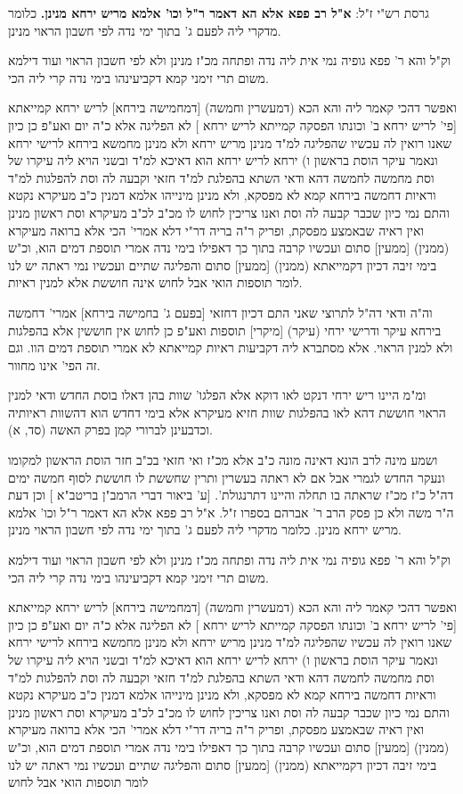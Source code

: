 \documentclass[12pt, openany]{book}
\begin{document}
{ גרסת רש"י ז"ל: \textbf{א"ל רב פפא אלא הא דאמר ר"ל וכו' אלמא מריש ירחא מנינן.}  כלומר מדקרי ליה לפעם ג' בתוך ימי נדה לפי חשבון הראוי מנינן.\par  וק"ל והא ר' פפא גופיה נמי אית ליה נדה ופתחה מכ"ז מנינן ולא לפי חשבון הראוי ועוד דילמא משום תרי זימני קמא דקביעינהו בימי נדה קרי ליה הכי.\par  ואפשר דהכי קאמר ליה והא הכא (דמעשרין וחמשה) [דמחמישה בירחא] לריש ירחא קמייאתא [{\small פי' לריש ירחא ב' וכונתו הפסקה קמייתא לריש ירחא} ] לא הפליגה אלא כ"ה יום ואע"פ כן כיון שאנו רואין לה עכשיו שהפליגה למ"ד מנינן מריש ירחא ולא מנינן מחמשא בירחא לרישי ירחא ונאמר עיקר הוסת בראשון ו) ירחא לריש ירחא הוא דאיכא למ"ד ובשני הויא ליה עיקרו של וסת מחמשה לחמשה דהא ודאי השתא בהפלגת למ"ד חזאי וקבעה לה וסת להפלגות למ"ד וראיות דחמשה בירחא קמא לא מפסקא, ולא מנינן מינייהו אלמא דמנין כ"ב מעיקרא נקטא והתם נמי כיון שכבר קבעה לה וסת ואנו צריכין לחוש לו מכ"ב לכ"ב מעיקרא וסת ראשון מנינן ואין ראיה שבאמצע מפסקת, ופריק ר"ה בריה דר"י דלא אמרי' הכי אלא ברואה מעיקרא (ממנין) [ממעין] סתום ועכשיו קרבה בתוך כך דאפילו בימי נדה אמרי תוספת דמים הוא, וכ"ש בימי זיבה דכיון דקמייאתא (ממנין) [ממעין] סתום והפליגה שתיים ועכשיו נמי ראתה יש לנו לומר תוספות הואי אבל לחוש אינה חוששת אלא למנין ראיות.\par  וה"ה ודאי דה"ל לתרוצי שאני התם דכיון דחזאי [בפעם ג' בחמישה בירחא] אמרי' דחמשה בירחא עיקר ודרישי ירחי (עיקר) [מיקרי] תוספות ואע"פ כן לחוש אין חוששין אלא בהפלגות ולא למנין הראוי. אלא מסתברא ליה דקביעות ראיות קמייאתא לא אמרי תוספת דמים הוו. וגם זה הפי' אינו מחוור.\par  ומ"מ היינו ריש ירחי דנקט לאו דוקא אלא הפלגו' שוות בהן דאלו בוסת החדש ודאי למנין הראוי חוששת דהא לאו בהפלגות שוות חזיא מעיקרא אלא בימי דחדש הוא דהשוות ראיותיה וכדבעינן לברורי קמן בפרק האשה (סד, א).\par ושמע מינה לרב הונא דאינה מונה כ"ב אלא מכ"ז ואי חזאי בכ"ב חזר הוסת הראשון למקומו ונעקר החדש לגמרי אבל אם לא ראתה בעשרין ותרין שחששת לו חוששת לסוף חמשה ימים דה"ל כ"ז מכ"ז שראתה בו תחלה והיינו דתרנגולת'. [{\small ע' ביאור דברי הרמב"ן בריטב"א} ] וכן דעת ה"ר משה ולא כן פסק הרב ר' אברהם בספרו ז"ל.  א"ל רב פפא אלא הא דאמר ר"ל וכו' אלמא מריש ירחא מנינן. כלומר מדקרי ליה לפעם ג' בתוך ימי נדה לפי חשבון הראוי מנינן.\par  וק"ל והא ר' פפא גופיה נמי אית ליה נדה ופתחה מכ"ז מנינן ולא לפי חשבון הראוי ועוד דילמא משום תרי זימני קמא דקביעינהו בימי נדה קרי ליה הכי.\par  ואפשר דהכי קאמר ליה והא הכא (דמעשרין וחמשה) [דמחמישה בירחא] לריש ירחא קמייאתא [{\small פי' לריש ירחא ב' וכונתו הפסקה קמייתא לריש ירחא} ] לא הפליגה אלא כ"ה יום ואע"פ כן כיון שאנו רואין לה עכשיו שהפליגה למ"ד מנינן מריש ירחא ולא מנינן מחמשא בירחא לרישי ירחא ונאמר עיקר הוסת בראשון ו) ירחא לריש ירחא הוא דאיכא למ"ד ובשני הויא ליה עיקרו של וסת מחמשה לחמשה דהא ודאי השתא בהפלגת למ"ד חזאי וקבעה לה וסת להפלגות למ"ד וראיות דחמשה בירחא קמא לא מפסקא, ולא מנינן מינייהו אלמא דמנין כ"ב מעיקרא נקטא והתם נמי כיון שכבר קבעה לה וסת ואנו צריכין לחוש לו מכ"ב לכ"ב מעיקרא וסת ראשון מנינן ואין ראיה שבאמצע מפסקת, ופריק ר"ה בריה דר"י דלא אמרי' הכי אלא ברואה מעיקרא (ממנין) [ממעין] סתום ועכשיו קרבה בתוך כך דאפילו בימי נדה אמרי תוספת דמים הוא, וכ"ש בימי זיבה דכיון דקמייאתא (ממנין) [ממעין] סתום והפליגה שתיים ועכשיו נמי ראתה יש לנו לומר תוספות הואי אבל לחוש }
\end{document}
